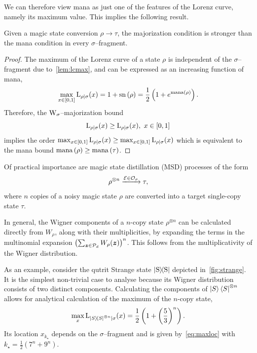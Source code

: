 \documentclass[pra,
aps,
twocolumn,
superscriptaddress,
groupedaddress,
nofootinbib,
reprint
]{revtex4-1}
\begin{document}
We can therefore view mana as just one of the features of the Lorenz curve, namely its maximum value. This implies the following result.
\begin{theorem}\label{thm:bounds}
    Given a magic state conversion $\rho \longrightarrow \tau$, the majorization condition is stronger than the mana condition in every $\sigma$--fragment.
\end{theorem}
\begin{proof}
    The maximum of the Lorenz curve of a state $\rho$ is independent of the $\sigma$--fragment due to~\cref{lem:lcmax}, and can be expressed as an increasing function of mana,
    \begin{equation}
        \max_{x\in[0,1]}{{{\rm{L}}_{\rho|\sigma}}(x)} = 1 + {{\rm{sn}}\left(\rho\right)} = \frac{1}{2} \left( 1 + e^{{\rm{mana}}\left(\rho\right)} \right).
    \end{equation}
    Therefore, the $\W{\sigma}$--majorization bound
    \begin{equation}
    	\lc{\rho}{\sigma}(x) \geq \lc{\rho}{\sigma}(x),\ x\in[0,1]
    \end{equation}
    implies the order $\max_{x\in[0,1]}{{{\rm{L}}_{\rho|\sigma}}(x)} \geq \max_{x\in[0,1]}{{{\rm{L}}_{\rho|\sigma}}(x)}$ which is equivalent to the mana bound ${{\rm{mana}}\left(\rho\right)} \geq {{\rm{mana}}\left(\tau\right)}$.
\end{proof}

Of practical importance are magic state distillation (MSD) processes of the form
\begin{equation}\label{eq:distprocess}
    \rho^{\otimes n} \xrightarrow{\mathcal{E} \in \mathcal{O}_\sigma} \tau,
\end{equation}
where $n$ copies of a noisy magic state $\rho$ are converted into a target single-copy state $\tau$. 

In general, the Wigner components of a $n$-copy state $\rho^{\otimes n}$ can be calculated directly from $W_\rho$, along with their multiplicities, by expanding the terms in the multinomial expansion $\left( \sum_{\bm{z} \in \mathcal{P}_d} W_\rho(\bm{z}) \right)^n$. 
This follows from the multiplicativity of the Wigner distribution.

As an example, consider the qutrit Strange state $\ketbra{\rm{S}}$ depicted in~\cref{fig:strange}. 
It is the simplest non-trivial case to analyse because its Wigner distribution consists of two distinct components.
Calculating the components of $\ket{S}\bra{S}^{\otimes n}$ allows for analytical calculation of the maximum of the $n$-copy state,
\begin{equation}\label{eq:Skmax}
    \max_x{{{\rm{L}}_{\ketbra{S}^{\otimes n}|\sigma}}}(x) = \frac{1}{2}\left (1 + \left(\frac{5}{3}\right)^n \right).
\end{equation}
Its location $x_{k_\star}$ depends on the $\sigma$--fragment and is given by~\cref{eq:maxloc} with $k_\star = \frac{1}{2}(7^n + 9^n)$.
\end{document}
